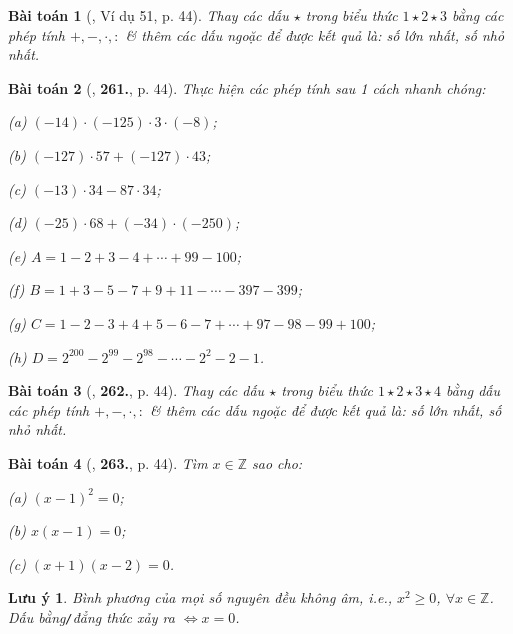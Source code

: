\documentclass{article}
\numberwithin{equation}{section}
\newtheorem{baitoan}{Bài toán}
\newtheorem{luuy}{Lưu ý}[section]
\begin{document}
\begin{baitoan}[\cite{Binh_Toan_6_tap_1}, Ví dụ 51, p. 44]
	Thay các dấu $\star$ trong biểu thức $1\star2\star3$ bằng các phép tính $+,-,\cdot,:$ \& thêm các dấu ngoặc để được kết quả là: số lớn nhất, số nhỏ nhất.
\end{baitoan}

\begin{baitoan}[\cite{Binh_Toan_6_tap_1}, \textbf{261.}, p. 44]
	Thực hiện các phép tính sau 1 cách nhanh chóng:
	\begin{enumerate*}
		\item[(a)] $(-14)\cdot(-125)\cdot3\cdot(-8)$;
		\item[(b)] $(-127)\cdot57 + (-127)\cdot43$;
		\item[(c)] $(-13)\cdot34 - 87\cdot34$;
		\item[(d)] $(-25)\cdot68 + (-34)\cdot(-250)$;
		\item[(e)] $A = 1 - 2 + 3 - 4 + \cdots + 99 - 100$;
		\item[(f)] $B = 1 + 3 - 5 - 7 + 9 + 11 - \cdots - 397 - 399$;
		\item[(g)] $C = 1 - 2 - 3 + 4 + 5 - 6 - 7 + \cdots + 97 - 98 - 99 + 100$;
		\item[(h)] $D = 2^{200} - 2^{99} - 2^{98} - \cdots - 2^2 - 2 - 1$.
	\end{enumerate*}
\end{baitoan}

\begin{baitoan}[\cite{Binh_Toan_6_tap_1}, \textbf{262.}, p. 44]
	Thay các dấu  $\star$ trong biểu thức $1\star2\star3\star4$ bằng dấu các phép tính $+,-,\cdot,:$ \& thêm các dấu ngoặc để được kết quả là: số lớn nhất, số nhỏ nhất.
\end{baitoan}

\begin{baitoan}[\cite{Binh_Toan_6_tap_1}, \textbf{263.}, p. 44]
	Tìm $x\in\mathbb{Z}$ sao cho:
	\begin{enumerate*}
		\item[(a)] $(x - 1)^2 = 0$;
		\item[(b)] $x(x - 1) = 0$;
		\item[(c)] $(x + 1)(x - 2) = 0$.
	\end{enumerate*}
\end{baitoan}

\begin{luuy}
	Bình phương của mọi số nguyên đều không âm, i.e., $x^2\ge0$, $\forall x\in\mathbb{Z}$. Dấu bằng\emph{\texttt{/}}đẳng thức xảy ra $\Leftrightarrow x = 0$.
\end{luuy}
\end{document}
